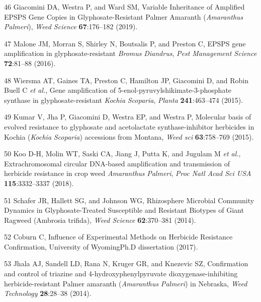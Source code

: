 \documentclass[
  12pt,
  a4paper]{article}
\begin{document}
\leavevmode\hypertarget{ref-giacomini_variable_2019}{}%
46 Giacomini DA, Westra P, and Ward SM, Variable Inheritance of
Amplified EPSPS Gene Copies in Glyphosate-Resistant Palmer Amaranth
(\emph{Amaranthus} \emph{Palmeri}), \emph{Weed Science}
\textbf{67}:176--182 (2019).

\leavevmode\hypertarget{ref-malone_epsps_2016}{}%
47 Malone JM, Morran S, Shirley N, Boutsalis P, and Preston C, EPSPS
gene amplification in glyphosate-resistant \emph{Bromus}
\emph{Diandrus}, \emph{Pest Management Science} \textbf{72}:81--88
(2016).

\leavevmode\hypertarget{ref-wiersma_gene_2015}{}%
48 Wiersma AT, Gaines TA, Preston C, Hamilton JP, Giacomini D, and Robin
Buell C \emph{et al.}, Gene amplification of
5-enol-pyruvylshikimate-3-phosphate synthase in glyphosate-resistant
\emph{Kochia} \emph{Scoparia}, \emph{Planta} \textbf{241}:463--474
(2015).

\leavevmode\hypertarget{ref-kumar_molecular_2015}{}%
49 Kumar V, Jha P, Giacomini D, Westra EP, and Westra P, Molecular basis
of evolved resistance to glyphosate and acetolactate synthase-inhibitor
herbicides in Kochia (\emph{Kochia} \emph{Scoparia}) accessions from
Montana, \emph{Weed sci} \textbf{63}:758--769 (2015).

\leavevmode\hypertarget{ref-koo_extrachromosomal_2018}{}%
50 Koo D-H, Molin WT, Saski CA, Jiang J, Putta K, and Jugulam M \emph{et
al.}, Extrachromosomal circular DNA-based amplification and transmission
of herbicide resistance in crop weed \emph{Amaranthus} \emph{Palmeri},
\emph{Proc Natl Acad Sci USA} \textbf{115}:3332--3337 (2018).

\leavevmode\hypertarget{ref-schafer_rhizosphere_2014}{}%
51 Schafer JR, Hallett SG, and Johnson WG, Rhizosphere Microbial
Community Dynamics in Glyphosate-Treated Susceptible and Resistant
Biotypes of Giant Ragweed (Ambrosia trifida), \emph{Weed Science}
\textbf{62}:370--381 (2014).

\leavevmode\hypertarget{ref-coburn_influence_2017}{}%
52 Coburn C, Influence of Experimental Methods on Herbicide Resistance
Confirmation, University of WyomingPh.D dissertation (2017).

\leavevmode\hypertarget{ref-jhala_confirmation_2014}{}%
53 Jhala AJ, Sandell LD, Rana N, Kruger GR, and Knezevic SZ,
Confirmation and control of triazine and 4-hydroxyphenylpyruvate
dioxygenase-inhibiting herbicide-resistant Palmer amaranth
(\emph{Amaranthus} \emph{Palmeri}) in Nebraska, \emph{Weed Technology}
\textbf{28}:28--38 (2014).
\end{document}
